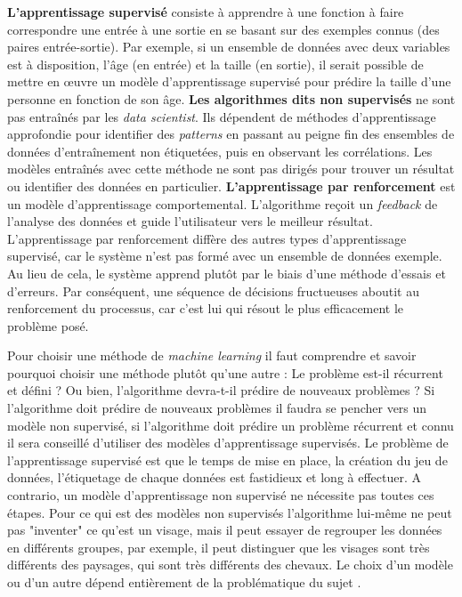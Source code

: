     \textbf{L’apprentissage supervisé} consiste à apprendre à une fonction à faire correspondre une entrée à une sortie en se basant sur des exemples connus (des paires entrée-sortie).
    Par exemple, si un ensemble de données avec deux variables est à disposition, l’âge (en entrée) et la taille (en sortie), il serait possible de mettre en œuvre un modèle d’apprentissage supervisé pour prédire la taille d’une personne en fonction de son âge. \textbf{Les algorithmes dits non supervisés} ne sont pas entraînés par les \textit{data scientist}. Ils dépendent de méthodes d’apprentissage approfondie pour identifier des \textit{patterns} en passant au peigne fin des ensembles de données d’entraînement non étiquetées, puis en observant les corrélations. Les modèles entraînés avec cette méthode ne sont pas dirigés pour trouver un résultat ou identifier des données en particulier. \textbf{L'apprentissage par renforcement} est un modèle d'apprentissage comportemental. L'algorithme reçoit un \textit{feedback} de l'analyse des données et guide l'utilisateur vers le meilleur résultat. L'apprentissage par renforcement diffère des autres types d'apprentissage supervisé, car le système n'est pas formé avec un ensemble de données exemple. Au lieu de cela, le système apprend plutôt par le biais d'une méthode d'essais et d'erreurs. Par conséquent, une séquence de décisions fructueuses aboutit au renforcement du processus, car c'est lui qui résout le plus efficacement le problème posé.

    Pour choisir une méthode de \textit{machine learning} il faut comprendre et savoir pourquoi choisir une méthode plutôt qu'une autre : Le problème est-il récurrent et défini ? Ou bien, l’algorithme devra-t-il prédire de nouveaux problèmes ? Si l'algorithme doit prédire de nouveaux problèmes il faudra se pencher vers un modèle non supervisé, si l'algorithme doit prédire un problème récurrent et connu il sera conseillé d'utiliser des modèles d'apprentissage supervisés. 
    Le problème de l'apprentissage supervisé est que le temps de mise en place, la création du jeu de données, l'étiquetage de chaque données est fastidieux et long à effectuer. A contrario, un modèle d'apprentissage non supervisé ne nécessite pas toutes ces étapes. 
    Pour ce qui est des modèles non supervisés l'algorithme lui-même ne peut pas "inventer" ce qu'est un visage, mais il peut essayer de regrouper les données en différents groupes, par exemple, il peut distinguer que les visages sont très différents des paysages, qui sont très différents des chevaux. 
    Le choix d'un modèle ou d'un autre dépend entièrement de la problématique du sujet \cite{zhao_object_2019}. 


